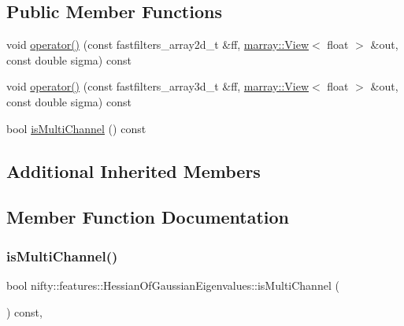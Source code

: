 \subsection*{Public Member Functions}
\begin{DoxyCompactItemize}
\item 
void \hyperlink{structnifty_1_1features_1_1HessianOfGaussianEigenvalues_a6195cb81a2b8a6570cb623e591c68781}{operator()} (const fastfilters\+\_\+array2d\+\_\+t \&ff, \hyperlink{classandres_1_1View}{marray\+::\+View}$<$ float $>$ \&out, const double sigma) const
\item 
void \hyperlink{structnifty_1_1features_1_1HessianOfGaussianEigenvalues_a7c21f5d043af68d6f330c5b9bdf95310}{operator()} (const fastfilters\+\_\+array3d\+\_\+t \&ff, \hyperlink{classandres_1_1View}{marray\+::\+View}$<$ float $>$ \&out, const double sigma) const
\item 
bool \hyperlink{structnifty_1_1features_1_1HessianOfGaussianEigenvalues_ab69872f7fb1e71080e1dc351610777ba}{is\+Multi\+Channel} () const
\end{DoxyCompactItemize}
\subsection*{Additional Inherited Members}


\subsection{Member Function Documentation}
\mbox{\label{structnifty_1_1features_1_1HessianOfGaussianEigenvalues_ab69872f7fb1e71080e1dc351610777ba}} 
\subsubsection{\texorpdfstring{is\+Multi\+Channel()}{isMultiChannel()}}
{\footnotesize\ttfamily bool nifty\+::features\+::\+Hessian\+Of\+Gaussian\+Eigenvalues\+::is\+Multi\+Channel (\begin{DoxyParamCaption}{ }\end{DoxyParamCaption}) const\hspace{0.3cm}{\ttfamily [inline]}, {\ttfamily [virtual]}}



